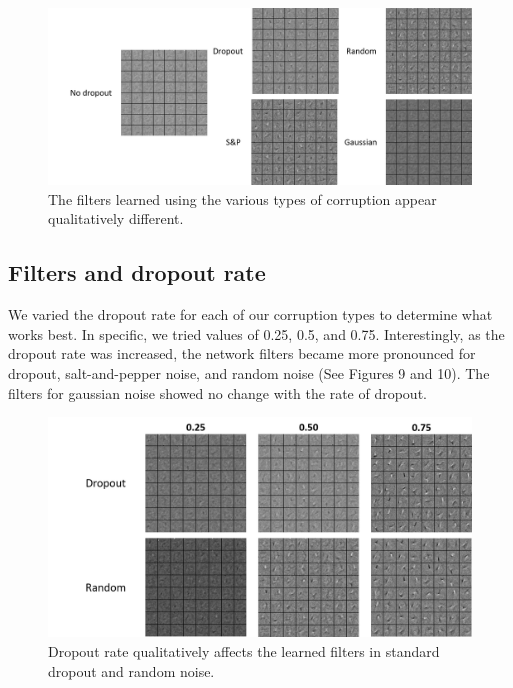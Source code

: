 \documentclass{article} %
\begin{document}
\begin{figure}
\begin{center}
\includegraphics[width=\textwidth]{filtersAndCorruptionType.png}
\caption{The filters learned using the various types of corruption appear qualitatively different.}
\end{center}
\end{figure}

\subsection{Filters and dropout rate}
We varied the dropout rate for each of our corruption types to determine what works best. In specific, we tried values of 0.25, 0.5, and 0.75. Interestingly, as the dropout rate was increased, the network filters became more pronounced for dropout, salt-and-pepper noise, and random noise (See Figures 9 and 10). The filters for gaussian noise showed no change with the rate of dropout.

\begin{figure}
\begin{center}
\includegraphics[width=\textwidth]{filtersAndDropoutRateDropRandom.png}
\caption{Dropout rate qualitatively affects the learned filters in standard dropout and random noise.}
\end{center}
\end{figure}
\end{document}
